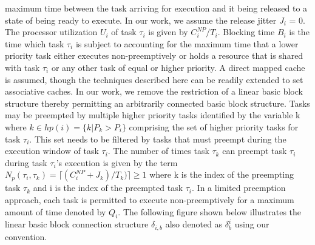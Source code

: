 maximum time between the task arriving for execution and it being released to a state of being ready to execute.  In our work, we assume the release jitter \begin{math}J_{i}\end{math} = 0.  The processor utilization \begin{math}U_{i}\end{math} of task \begin{math}\tau_{i}\end{math} is given by \begin{math}C_{i}^{NP}/T_{i}\end{math}. Blocking time \begin{math}B_{i}\end{math} is the time which task \begin{math}\tau_{i}\end{math} is subject to accounting for the maximum time that a lower priority task either executes non-preemptively or holds a resource that is shared with task \begin{math}\tau_{i}\end{math} or any other task of equal or higher priority.  A direct mapped cache is assumed, though the techniques described here can be readily extended to set associative caches.  In our work, we remove the restriction of a linear basic block structure thereby permitting an arbitrarily connected basic block structure.  Tasks may be preempted by multiple higher priority tasks identified by the variable k where \begin{math}k \in hp(i) = \{k | P_{k} > P_{i}\}\end{math} comprising the set of higher priority tasks for task \begin{math}\tau_{i}\end{math}.  This set needs to be filtered by tasks that must preempt during the execution window of task \begin{math}\tau_{i}\end{math}.  The number of times task \begin{math}\tau_{k}\end{math} can preempt task \begin{math}\tau_{i}\end{math} during task \begin{math}\tau_{i}\end{math}'s execution is given by the term \begin{math}N_{p}(\tau_{i},\tau_{k})=\lceil(C_{i}^{NP} + J_{k})/T_{k})\rceil \geq 1 \end{math} where k is the index of the preempting task \begin{math}\tau_{k}\end{math} and i is the index of the preempted task \begin{math}\tau_{i}\end{math}.  In a limited preemption approach, each task is permitted to execute non-preemptively for a maximum amount of time denoted by \begin{math}Q_{i}\end{math}.  The following figure shown below illustrates the linear basic block connection structure \begin{math}\delta_{i,b}\end{math} also denoted as \begin{math}\delta_{b}^{i}\end{math} using our convention.

